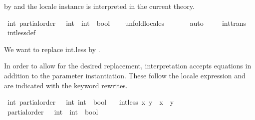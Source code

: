 \begin{isabellebody}
\begin{isamarkuptext}
by \isa{{\isacharparenleft}{\kern0pt}{\isasymle}{\isacharparenright}{\kern0pt}} and the locale instance is interpreted in the current theory.%
\end{isamarkuptext}\isamarkuptrue%
\isamarkupfalse%
\ int{\isacharcolon}{\kern0pt}\ partial{\isacharunderscore}{\kern0pt}order\ {\isachardoublequoteopen}{\isacharparenleft}{\kern0pt}{\isasymle}{\isacharparenright}{\kern0pt}\ {\isacharcolon}{\kern0pt}{\isacharcolon}{\kern0pt}\ int\ {\isasymRightarrow}\ int\ {\isasymRightarrow}\ bool{\isachardoublequoteclose}\isanewline
%
\isadelimproof
\ \ %
\endisadelimproof
%
\isatagproof
{}\isamarkupfalse%
\ unfold{\isacharunderscore}{\kern0pt}locales\ \isanewline
\ \ \ \ \isamarkupfalse%
\ auto\ \isanewline
\ \ \isamarkupfalse%
%
\endisatagproof
{\isafoldproof}%
%
\isadelimproof
\isanewline
%
\endisadelimproof
\isanewline
{}\isamarkupfalse%
\ int{\isachardot}{\kern0pt}trans\isanewline
{}\isamarkupfalse%
\ int{\isachardot}{\kern0pt}less{\isacharunderscore}{\kern0pt}def%
\begin{isamarkuptext}%
We want to replace int.less by \isa{{\isacharless}{\kern0pt}}.%
\end{isamarkuptext}\isamarkuptrue%
%
\begin{isamarkuptext}%
In order to allow for the desired replacement,
interpretation accepts equations in addition to the parameter instantiation. 
These follow the locale expression and are indicated with the keyword rewrites.%
\end{isamarkuptext}\isamarkuptrue%
\isamarkupfalse%
\ int{\isacharcolon}{\kern0pt}\ partial{\isacharunderscore}{\kern0pt}order\ {\isachardoublequoteopen}{\isacharparenleft}{\kern0pt}{\isasymle}{\isacharparenright}{\kern0pt}\ {\isacharcolon}{\kern0pt}{\isacharcolon}{\kern0pt}\ {\isacharbrackleft}{\kern0pt}int{\isacharcomma}{\kern0pt}\ int{\isacharbrackright}{\kern0pt}\ {\isasymRightarrow}\ bool{\isachardoublequoteclose}\isanewline
\ \ \ {\isachardoublequoteopen}int{\isachardot}{\kern0pt}less\ x\ y\ {\isacharequal}{\kern0pt}\ {\isacharparenleft}{\kern0pt}x\ {\isacharless}{\kern0pt}\ y{\isacharparenright}{\kern0pt}{\isachardoublequoteclose}\isanewline
\ \ \isanewline
%
\isadelimproof
%
\endisadelimproof
%
\isatagproof
{}\isamarkupfalse%
{\isacharminus}{\kern0pt}\isanewline
\ \ \isamarkupfalse%
\ {\isachardoublequoteopen}partial{\isacharunderscore}{\kern0pt}order\ {\isacharparenleft}{\kern0pt}{\isacharparenleft}{\kern0pt}{\isasymle}{\isacharparenright}{\kern0pt}\ {\isacharcolon}{\kern0pt}{\isacharcolon}{\kern0pt}\ int\ {\isasymRightarrow}\ int\ {\isasymRightarrow}\ bool{\isacharparenright}{\kern0pt}{\isachardoublequoteclose}\isanewline

\end{isabellebody}
